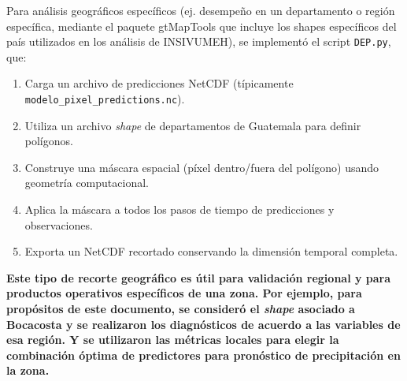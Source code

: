 Para análisis geográficos específicos (ej. desempeño en un departamento o región específica, mediante el paquete gtMapTools que incluye los shapes específicos del país utilizados en los análisis de INSIVUMEH), se implementó el script \texttt{DEP.py}, que:
\begin{enumerate}
    \item Carga un archivo de predicciones NetCDF (típicamente \texttt{modelo\_pixel\_predictions.nc}).
    \item Utiliza un archivo \textit{shape} de departamentos de Guatemala para definir polígonos.
    \item Construye una máscara espacial (píxel dentro/fuera del polígono) usando geometría computacional.
    \item Aplica la máscara a todos los pasos de tiempo de predicciones y observaciones.
    \item Exporta un NetCDF recortado conservando la dimensión temporal completa.
\end{enumerate}

\textbf{Este tipo de recorte geográfico es útil para validación regional y para productos operativos específicos de una zona. Por ejemplo, para propósitos de este documento, se consideró el \textit{shape} asociado a Bocacosta y se realizaron los diagnósticos de acuerdo a las variables de esa región. Y se utilizaron las métricas locales para elegir la combinación óptima de predictores para pronóstico de precipitación en la zona. 
}